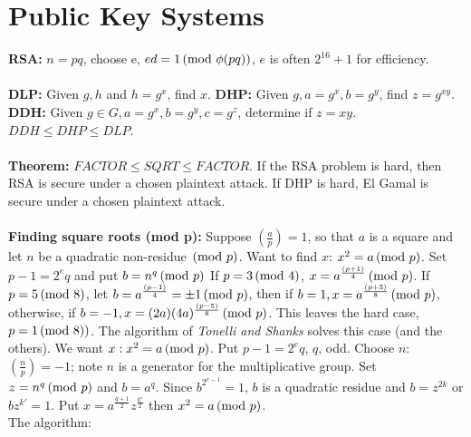 \section{Public Key Systems}
{\bf RSA: } $n=pq$, choose e, $ed=1 \thinspace \textnormal{(mod } \phi(pq) \textnormal{)}$, $e$ is often $2^{16}+1$ for efficiency.
\\
\\
{\bf DLP: } Given $g, h$ and $h=g^x$, find $x$.  
{\bf DHP: }  Given $g, a=g^x, b=g^y$, find $z= g^{xy}$.
{\bf DDH: } Given $g \in G, a=g^x, b=g^y, c=g^z$, determine if $z=xy$.  $DDH \le DHP \le DLP$.
\\
\\
{\bf Theorem: } $FACTOR \le SQRT \le FACTOR$.  
If the RSA problem is hard, then RSA is secure under a chosen plaintext attack.  If DHP
is hard, El Gamal is secure under a chosen plaintext attack.
\\
\\
{\bf Finding square roots (mod p): } 
Suppose $({\frac a p})=1$, so that $a$ is a square and let $n$ be a quadratic
non-residue  $\thinspace \textnormal{(mod } p \textnormal{)}$.  Want to find $x$:
$x^2= a \thinspace \textnormal{(mod } p \textnormal{)}$.  Set $p-1= 2^{e}q$ and put $b=n^q \thinspace \textnormal{(mod } p \textnormal{)}$
If $p= 3 \thinspace \textnormal{(mod } 4 \textnormal{)}$, $x= a^{\frac {(p+1)} {4 }} \thinspace \textnormal{(mod } p \textnormal{)}$.
If $p= 5 \thinspace \textnormal{(mod } 8 \textnormal{)}$, let
$b=a^{\frac {(p-1)}{4}} = \pm 1\thinspace \textnormal{(mod } p \textnormal{)}$, then
if $b=1, x= a^{\frac {(p+3)} {8}} \thinspace \textnormal{(mod } p \textnormal{)}$, otherwise,
if $b= -1, x= (2a)(4a)^{\frac {(p-5)} {8}} \thinspace \textnormal{(mod } p \textnormal{)}$.
This leaves the hard case, $p=1 \thinspace \textnormal{(mod } 8) \textnormal{)}$.  The algorithm of \emph {Tonelli
and Shanks} solves this case (and the others).
We want $x: x^2= a \thinspace \textnormal{(mod } p \textnormal{)}$.  Put
$p-1=2^e  q$, $q$, odd.
Choose $n$: $({\frac n p})= -1$; note $n$ is a generator
for the multiplicative group. Set $z= n^q \thinspace \textnormal{(mod } p \textnormal{)}$ and $b= a^q$.  Since $b^{2^{e-1}}= 1$,
$b$ is a quadratic residue and $b= z^{2k}$ or $bz^{k'}=1$.  Put $x= a^{\frac {q+1} 2} z^{{\frac {k'} 2}}$
then $x^2 = a \thinspace \textnormal{(mod } p \textnormal{)}$.
\\
The algorithm:\\

